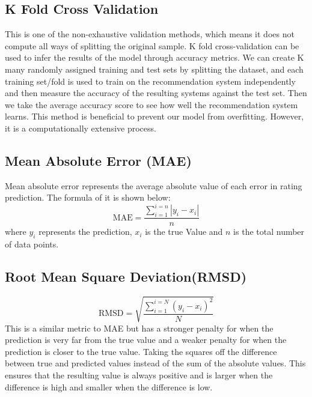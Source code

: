 \subsection{K Fold Cross Validation}
This is one of the non-exhaustive validation methods, which means it does not compute all ways of splitting the original sample. 
K fold cross-validation can be used to infer the results of the model through accuracy metrics. We can create K many randomly assigned training and test sets by splitting the dataset, and each training set/fold is used to train on the recommendation system independently and then measure the accuracy of the resulting systems against the test set. Then we take the average accuracy score to see how well the recommendation system learns. This method is beneficial to prevent our model from overfitting. However, it is a computationally extensive process.

\subsection{Mean Absolute Error (MAE)}
Mean absolute error represents the average absolute value of each error in rating prediction. The formula of it is shown below:
\begin{equation*}
\text{MAE} = \frac{\sum^{i=n}_{i=1}|y_{i} - x_{i}|}{n}
\end{equation*}
where $y_{i} $ represents the prediction, $x_{i} $ is the true Value and $n$ is the total number of data points. 

\subsection{Root Mean Square Deviation(RMSD)}
\begin{equation*}
\text{RMSD} = \sqrt{\frac{\sum^{i=N}_{i=1}(y_{i} - x_{i})^{2}}{N}}
\end{equation*}
This is a similar metric to MAE but has a stronger penalty for when the prediction is very far from the true value and a weaker penalty for when the prediction is closer to the true value. Taking the squares off the difference between true and predicted values instead of the sum of the absolute values. This ensures that the resulting value is always positive and is larger when the difference is high and smaller when the difference is low.



